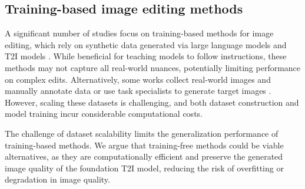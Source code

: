 \documentclass{article}
\newenvironment{cyanpar}{\color{cyan}}{}
\begin{document}
\subsection{Training-based image editing methods}

\begin{cyanpar}
A significant number of studies focus on training-based methods for image editing, which rely on synthetic data generated via large language models and T2I models \citep{brooks2023instructpix2pix, hui2024hq}. While beneficial for teaching models to follow instructions, these methods may not capture all real-world nuances, potentially limiting performance on complex edits. Alternatively, some works collect real-world images and manually annotate data or use task specialists to generate target images \citep{zhang2023magicbrush, wasserman2024paint, wei2024omniedit}. However, scaling these datasets is challenging, and both dataset construction and model training incur considerable computational costs.

The challenge of dataset scalability limits the generalization performance of training-based methods. We argue that training-free methods could be viable alternatives, as they are computationally efficient and preserve the generated image quality of the foundation T2I model, reducing the risk of overfitting or degradation in image quality.

\end{cyanpar}


\end{document}
